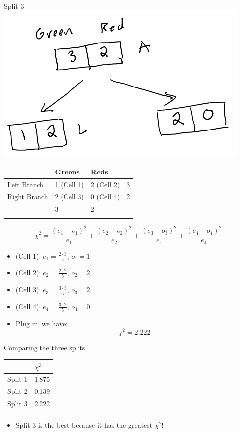 \documentclass[
  ignorenonframetext,
]{beamer}
\providecommand{\tightlist}{%
  \setlength{\itemsep}{0pt}\setlength{\parskip}{0pt}}
\begin{document}
\begin{frame}{Split 3}
\label{split-3}
\includegraphics{images/im2.png}

\begin{longtable}[]{@{}llll@{}}
\toprule\noalign{}
& Greens & Reds & \\
\midrule\noalign{}
\endhead
Left Branch & 1 (Cell 1) & 2 (Cell 2) & 3 \\
Right Branch & 2 (Cell 3) & 0 (Cell 4) & 2 \\
& 3 & 2 & \\
\bottomrule\noalign{}
\end{longtable}

\[\chi^2 = \frac{(e_1-o_1)^2}{e_1}+\frac{(e_2-o_2)^2}{e_2}+\frac{(e_3-o_3)^2}{e_3}+\frac{(e_4-o_4)^2}{e_4}\]

\begin{itemize}
\item
  (Cell 1): \(e_1 = \frac{2\cdot 3}{5}\), \(o_1 = 1\)
\item
  (Cell 2): \(e_2 = \frac{2\cdot 2}{5}\), \(o_2 = 2\)
\item
  (Cell 3): \(e_3 = \frac{3\cdot 3}{5}\), \(o_3 = 2\)
\item
  (Cell 4): \(e_4 = \frac{3\cdot 2}{5}\), \(o_4 = 0\)
\item
  Plug in, we have: \[\chi^2 = 2.222\]
\end{itemize}
\end{frame}

\begin{frame}{Comparing the three splits}
\label{comparing-the-three-splits}
\begin{longtable}[]{@{}ll@{}}
\toprule\noalign{}
& \(\chi^2\) \\
\midrule\noalign{}
\endhead
Split 1 & 1.875 \\
Split 2 & 0.139 \\
Split 3 & 2.222 \\
\bottomrule\noalign{}
\end{longtable}

\begin{itemize}
\tightlist
\item
  Split 3 is the best because it has the greatest \(\chi^2\)!
\end{itemize}
\end{frame}
\end{document}
